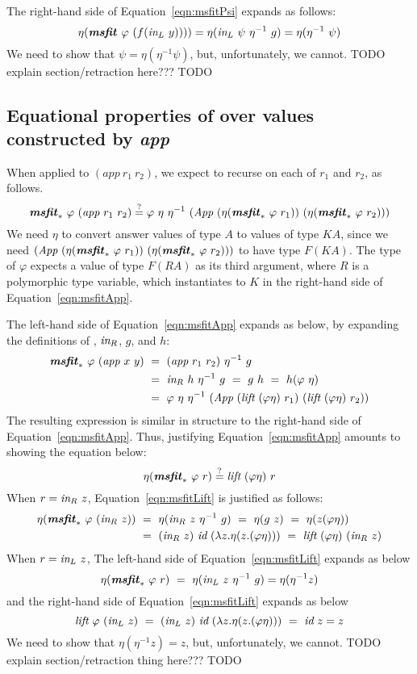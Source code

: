 The right-hand side of Equation~\ref{eqn:msfitPsi} expands as follows:
\[ \eta(\textbf{\textit{msfit}}_{~}\varphi~(f(\textit{in}_{L}~y)))) = \eta(\textit{in}_{L}~\psi~\eta^{-1}~g)
	= \eta(\eta^{-1}~\psi)
\]
We need to show that $\psi=\eta(\eta^{-1}\psi)$, but, unfortunately, we cannot.
TODO explain section/retraction here??? TODO 

\subsection{Equational properties of \msfit{*} over
	values constructed by \textit{app}}
When applied to $(\textit{app}~r_1~r_2)$, we expect \msfit{*} to
recurse on each of $r_1$ and $r_2$, as follows.
\begin{equation}
\textbf{\textit{msfit}}_{*}~\varphi~(\textit{app}~r_1~r_2)
\stackrel{?}{=}
\varphi~\eta~\eta^{-1}~(\textit{App}~(\eta(\textbf{\textit{msfit}}_{*}~\varphi~r_1))
					~(\eta(\textbf{\textit{msfit}}_{*}~\varphi~r_2)))
\label{eqn:msfitApp}
\end{equation}
We need $\eta$ to convert answer values of type $A$ to values of type $KA$,
since we need $(\textit{App}~(\eta(\textbf{\textit{msfit}}_{*}~\varphi~r_1))
					~(\eta(\textbf{\textit{msfit}}_{*}~\varphi~r_2)))$
to have type $F(KA)$. The type of $\varphi$ expects a value of type $F(RA)$
as its third argument, where $R$ is a polymorphic type variable, which
instantiates to $K$ in the right-hand side of Equation~\ref{eqn:msfitApp}.

The left-hand side of Equation~\ref{eqn:msfitApp} expands as below,
by expanding the definitions of \msfit{*}, $\textit{in}_{R}$, $g$, and  $h$:
\begin{align*}
\textbf{\textit{msfit}}_{*}~\varphi~(\textit{app}~x~y)
&~=~ (\textit{app}~r_1~r_2)~\eta^{-1}~g \\
&~=~ \textit{in}_{R}~h~\eta^{-1}~g ~=~ g~h ~=~ h(\varphi~\eta) \\
&~=~ \varphi~\eta~\eta^{-1}
     ~(\textit{App}~(\textit{lift}~(\varphi\eta)~r_1)~(\textit{lift}~(\varphi\eta)~r_2))
\end{align*}
The resulting expression is similar in structure to the right-hand side of
Equation~\ref{eqn:msfitApp}. Thus, justifying Equation~\ref{eqn:msfitApp}
amounts to showing the equation below:
\begin{equation}
\eta(\textbf{\textit{msfit}}_{*}~\varphi~r) \stackrel{?}{=} \textit{lift}~(\varphi\eta)~r
\label{eqn:msfitLift}
\end{equation}
When $r = \textit{in}_{R}~z$, Equation~\ref{eqn:msfitLift} is justified as follows:
\begin{align*}
\eta(\textbf{\textit{msfit}}_{*}~\varphi~(\textit{in}_{R}~z))
&~=~ \eta(\textit{in}_{R}~z~\eta^{-1}~g) ~=~ \eta(g~z) ~=~ \eta(z(\varphi\eta)) \\
&~=~ (\textit{in}_{R}~z)~\textit{id}~(\lambda z.\eta(z.(\varphi\eta)))
 ~=~ \textit{lift}~(\varphi\eta)~(\textit{in}_{R}~z)
\end{align*}
When $r = \textit{in}_{L}~z$,
The left-hand side of Equation~\ref{eqn:msfitLift} expands as below
\[ \eta(\textbf{\textit{msfit}}_{*}~\varphi~r) ~=~\eta(\textit{in}_{L}~z~\eta^{-1}~g) = \eta(\eta^{-1}z)
\]
and the right-hand side of Equation~\ref{eqn:msfitLift} expands as below
\[ \textit{lift}~\varphi~(\textit{in}_{L}~z)
   ~=~ (\textit{in}_{L}~z)~\textit{id}~(\lambda z.\eta(z.(\varphi\eta)))
   ~=~ \textit{id}~z = z
\]
We need to show that $\eta(\eta^{-1}z) = z$, but, unfortunately, we cannot.
TODO explain section/retraction thing here??? TODO

